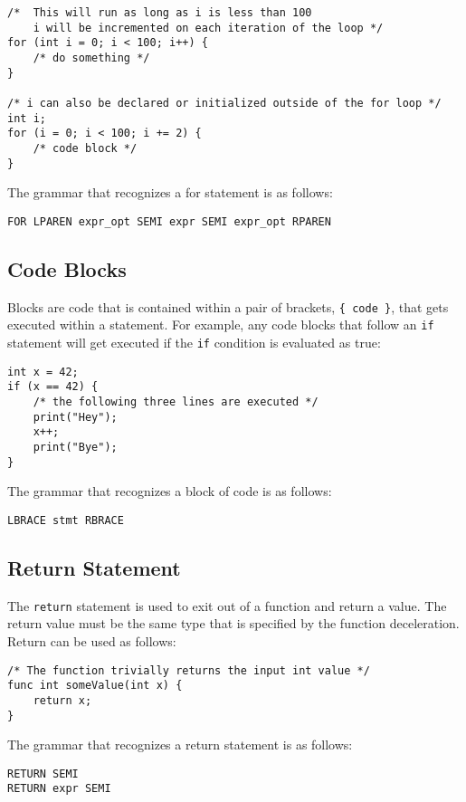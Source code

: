 \documentclass{article}
\begin{document}
\begin{lstlisting}
/* 	This will run as long as i is less than 100
	i will be incremented on each iteration of the loop */
for (int i = 0; i < 100; i++) {
	/* do something */
}

/* i can also be declared or initialized outside of the for loop */
int i;
for (i = 0; i < 100; i += 2) {
	/* code block */
}
\end{lstlisting}

The grammar that recognizes a for statement is as follows:
\begin{Verbatim}[frame=single]
FOR LPAREN expr_opt SEMI expr SEMI expr_opt RPAREN
\end{Verbatim}

\subsection{Code Blocks}
Blocks are code that is contained within a pair of brackets, \texttt{\{ code \}}, that gets executed within a statement.  For example, any code blocks that follow an \texttt{if} statement will get executed if the \texttt{if} condition is evaluated as true:

\begin{lstlisting}
int x = 42;
if (x == 42) {
	/* the following three lines are executed */
	print("Hey");
	x++;
	print("Bye");
}
\end{lstlisting}

The grammar that recognizes a block of code is as follows:
\begin{Verbatim}[frame=single]
LBRACE stmt RBRACE
\end{Verbatim}

\subsection{Return Statement}
The \texttt{return} statement is used to exit out of a function and return a value.  The return value must be the same type that is specified by the function deceleration.  Return can be used as follows:

\begin{lstlisting}
/* The function trivially returns the input int value */
func int someValue(int x) {
	return x;
}
\end{lstlisting}

The grammar that recognizes a return statement is as follows:
\begin{Verbatim}[frame=single]
RETURN SEMI
RETURN expr SEMI
\end{Verbatim}
\end{document}
